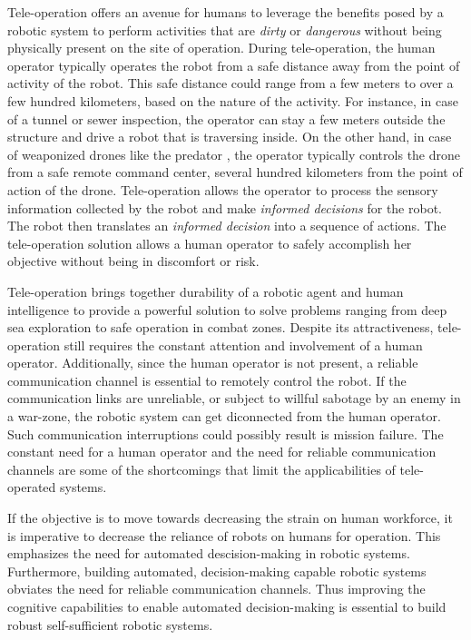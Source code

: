 \documentclass {udthesis}
\begin{document}
Tele-operation offers an avenue for humans to leverage the benefits posed by a robotic system to perform activities 
that are \emph{dirty} or \emph{dangerous} without being physically present on the site of operation. During tele-operation, the human operator 
typically operates the robot from a safe distance away from the point of activity of the robot. This safe distance could range from a few meters to over a few hundred kilometers, based on the nature of the activity. For instance, in case of a tunnel or sewer inspection, the operator can stay a few meters outside the structure and drive a robot that is traversing inside. On the other hand, in case of weaponized drones like the predator \cite{predator}, the operator typically controls the drone from a safe remote command center, several hundred kilometers from the point of action of the drone. Tele-operation allows the operator to process the sensory information collected by the robot and make \emph{informed decisions} for the robot. The robot then translates an \emph{informed decision} into a sequence of actions. The tele-operation solution allows a human operator to safely accomplish her objective 
without being in discomfort or risk. 

Tele-operation brings together durability of a robotic agent and human intelligence to provide a powerful solution to solve problems ranging from deep sea exploration to safe operation in combat zones. Despite its attractiveness, tele-operation still requires the constant attention and involvement of a human operator. Additionally, since the human operator is not present, a reliable communication channel is essential to remotely control the robot. If the communication links are unreliable, or subject to willful sabotage by an enemy in a war-zone, the robotic system can get diconnected from the human operator. Such communication interruptions could possibly result is mission failure. The constant need for a human operator and the need for reliable communication channels are some of the shortcomings that limit the applicabilities of tele-operated systems.

If the objective is to move towards decreasing the strain on human workforce, it is imperative to decrease the reliance of robots on humans for operation. This emphasizes the need for automated descision-making in robotic systems. Furthermore, building automated, decision-making capable robotic systems obviates the need for reliable communication channels. Thus improving the cognitive capabilities to enable automated decision-making is essential to build robust self-sufficient robotic systems.
\end{document}

